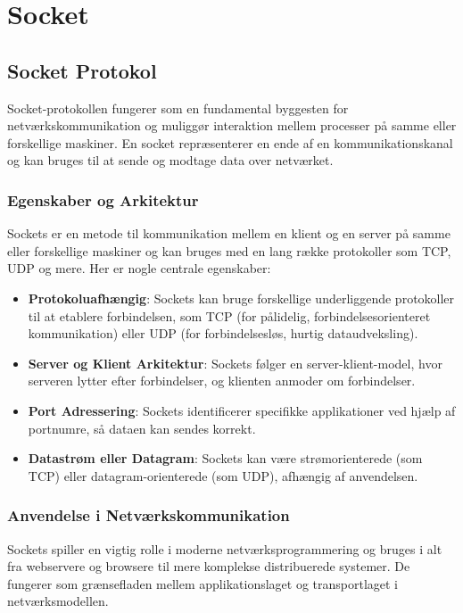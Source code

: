 \documentclass[12pt,a4paper]{book}
\begin{document}
	\chapter{Socket}
	\section{Socket Protokol}
	
	Socket-protokollen fungerer som en fundamental byggesten for netværkskommunikation og muliggør interaktion mellem processer på samme eller forskellige maskiner. En socket repræsenterer en ende af en kommunikationskanal og kan bruges til at sende og modtage data over netværket.
	
	\subsection*{Egenskaber og Arkitektur}
	Sockets er en metode til kommunikation mellem en klient og en server på samme eller forskellige maskiner og kan bruges med en lang række protokoller som TCP, UDP og mere. Her er nogle centrale egenskaber:
	
	\begin{itemize}
		\item \textbf{Protokoluafhængig}: Sockets kan bruge forskellige underliggende protokoller til at etablere forbindelsen, som TCP (for pålidelig, forbindelsesorienteret kommunikation) eller UDP (for forbindelsesløs, hurtig dataudveksling).
		\item \textbf{Server og Klient Arkitektur}: Sockets følger en server-klient-model, hvor serveren lytter efter forbindelser, og klienten anmoder om forbindelser.
		\item \textbf{Port Adressering}: Sockets identificerer specifikke applikationer ved hjælp af portnumre, så dataen kan sendes korrekt.
		\item \textbf{Datastrøm eller Datagram}: Sockets kan være strømorienterede (som TCP) eller datagram-orienterede (som UDP), afhængig af anvendelsen.
	\end{itemize}
	
	\subsection*{Anvendelse i Netværkskommunikation}
	Sockets spiller en vigtig rolle i moderne netværksprogrammering og bruges i alt fra webservere og browsere til mere komplekse distribuerede systemer. De fungerer som grænsefladen mellem applikationslaget og transportlaget i netværksmodellen.
	
\end{document}

